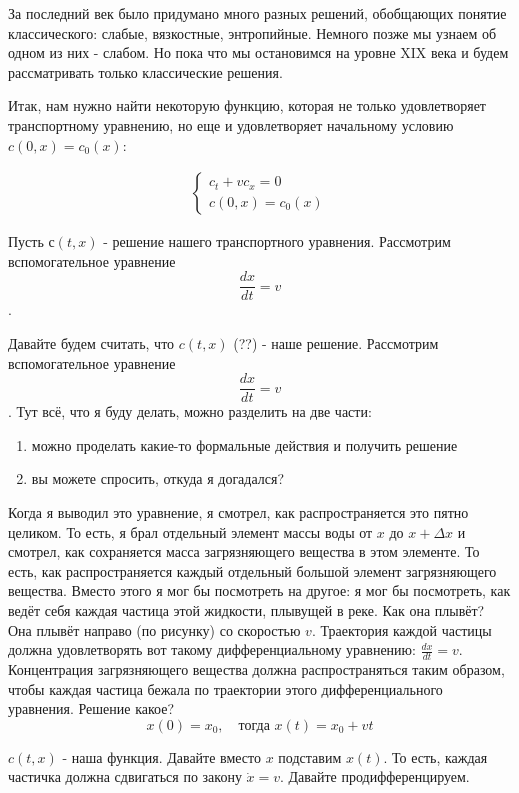 За последний век было придумано много разных решений, обобщающих понятие классического: слабые, вязкостные, энтропийные. Немного позже мы узнаем об одном из них - слабом. Но пока что мы остановимся на уровне XIX века и будем рассматривать только классические решения.

Итак, нам нужно найти некоторую функцию, которая не только удовлетворяет транспортному уравнению, но еще и удовлетворяет начальному условию $ c (0, x) = c_0 (x) $:

\begin{align}
    \begin{cases} 
        c_t + v c_x  =0 \\
        c (0, x) = c_0 (x)
    \end{cases}
\label{transport}
\end{align}

Пусть $ с (t, x) $ - решение нашего транспортного уравнения. Рассмотрим вспомогательное уравнение $$ \frac {dx} {dt} = v $$.

\pagebreak

Давайте будем считать, что $ c(t, x) $ (??) - наше решение. Рассмотрим вспомогательное уравнение $$ \frac {dx} {dt} = v $$. Тут всё, что я буду делать, можно разделить на две части:
\begin{enumerate}
\item можно проделать какие-то формальные действия и получить решение
\item вы можете спросить, откуда я догадался?
\end{enumerate}

Когда я выводил это уравнение, я смотрел, как распространяется это пятно целиком. То есть, я брал отдельный элемент массы воды от $x$ до $ x + \Delta x $ и смотрел, как сохраняется масса загрязняющего вещества в этом элементе. То есть, как распространяется каждый отдельный большой элемент загрязняющего вещества. Вместо этого я мог бы посмотреть на другое: я мог бы посмотреть, как ведёт себя каждая частица этой жидкости, плывущей в реке. Как она плывёт? Она плывёт направо (по рисунку) со скоростью $v$. Траектория каждой частицы должна удовлетворять вот такому дифференциальному уравнению: $ \displaystyle \frac {dx} {dt} = v $. Концентрация загрязняющего вещества должна распространяться таким образом, чтобы каждая частица бежала по траектории этого дифференциального уравнения.
Решение какое?
$$ x(0) = x_0,\quad \text{тогда }x(t) = x_0 + v t $$

$c (t, x)$ - наша функция. Давайте вместо $x$ подставим $ x(t) $. То есть, каждая частичка должна сдвигаться по закону $\dot x = v$. Давайте продифференцируем.

